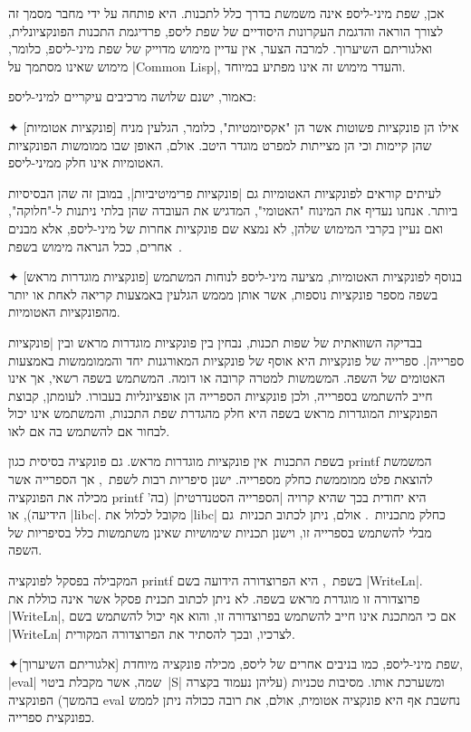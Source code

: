 אכן, שפת מיני-ליספ אינה משמשת בדרך כלל לתכנות. היא פותחה על ידי מחבר מסמך זה
לצורך הוראה והדגמת העקרונות היסודיים של שפת ליספ, פרדיגמת התכנות הפונקציונלית,
ואלגוריתם השיערוך. למרבה הצער, אין עדיין מימוש מדוייק של שפת מיני-ליספ, כלומר,
מימוש שאינו מסתמך על \E|Common Lisp|, והעדר מימוש זה אינו מפתיע במיוחד.

כאמור, ישנם שלושה מרכיבים עיקריים למיני-ליספ:
\begin{description}
  ✦ [פונקציות אטומיות] אילו הן פונקציות פשוטות אשר הן "אקסיומטיות", כלומר,
  הגלעין מניח שהן קיימות וכי הן מצייתות למפרט מוגדר היטב. אולם, האופן שבו
  ממומשות הפונקציות האטומיות אינו חלק ממיני-ליספ.

  לעיתים קוראים לפונקציות האטומיות גם \ע|פונקציות פרימיטיביות|, במובן זה שהן
  הבסיסיות ביותר. אנחנו נעדיף את המינוח "האטומי", המדגיש את העובדה שהן בלתי
  ניתנות ל-"חלוקה", ואם נעיין בקרבי המימוש שלהן, לא נמצא שם פונקציות אחרות של
  מיני-ליספ, אלא מבנים אחרים, ככל הנראה מימוש בשפת~\CPL.

  ✦ [פונקציות מוגדרות מראש] בנוסף לפונקציות האטומיות, מציעה מיני-ליספ לנוחות
  המשתמש בשפה מספר פונקציות נוספות, אשר אותן מממש הגלעין באמצעות קריאה
  לאחת או יותר מהפונקציות האטומיות.

  בבדיקה השוואתית של שפות תכנות, נבחין בין פונקציות מוגדרות מראש ובין
  \ע|פונקציות ספרייה|. ספרייה של פונקציות היא אוסף של פונקציות המאורגנות יחד
  והממוממשות באמצעות האטומים של השפה. המשמשות למטרה קרובה או דומה. המשתמש
  בשפה רשאי, אך אינו חייב להשתמש בספרייה, ולכן פונקציות הספרייה הן אופציונליות
  בעבורו. לעומתן, קבוצת הפונקציות המוגדרות מראש בשפה היא חלק מהגדרת שפת התכנות,
  והמשתמש אינו יכול לבחור אם להשתמש בה אם לאו.

  בשפת התכנות~\CPL אין פונקציות מוגדרות מראש. גם פונקציה בסיסית כגון printf
  המשמשת להוצאת פלט ממוממשת כחלק מספרייה. ישנן סיפריות רבות לשפת~\CPL, אך
  הספרייה אשר מכילה את הפונקציה printf היא יחודית בכך שהיא קרויה \ע|הספרייה
  הסטנדרטית| (בה' הידיעה), או \E|libc|. מקובל לכלול את \E|libc| כחלק
  מתכניות~\CPL. אולם, ניתן לכתוב תכניות~\CPL גם מבלי להשתמש בספרייה זו, וישנן
  תכניות שימושיות שאינן משתמשות כלל בסיפריות של השפה.

  המקבילה בפסקל לפונקציה printf בשפת~\CPL, היא הפרוצדורה הידועה בשם
  \E|WriteLn|. פרוצדורה זו מוגדרת מראש בשפה. לא ניתן לכתוב תכנית פסקל אשר אינה
  כוללת את \E|WriteLn|, אם כי המתכנת אינו חייב להשתמש בפרוצדורה זו, והוא אף
  יכול להשתמש בשם \E|WriteLn| לצרכיו, ובכך להסתיר את הפרוצדורה המקורית.

  ✦[אלגוריתם השיערוך] שפת מיני-ליספ, כמו בניבים אחרים של ליספ, מכילה פונקציה
  מיוחדת, \E|eval| שמה, אשר מקבלת ביטוי~\E|S| ומשערכת אותו. מסיבות טכניות
  (עליהן נעמוד בקצרה בהמשך) הפונקציה eval נחשבת אף היא פונקציה אטומית, אולם, את
  רובה ככולה ניתן לממש כפונקצית ספרייה.
\end{description}

